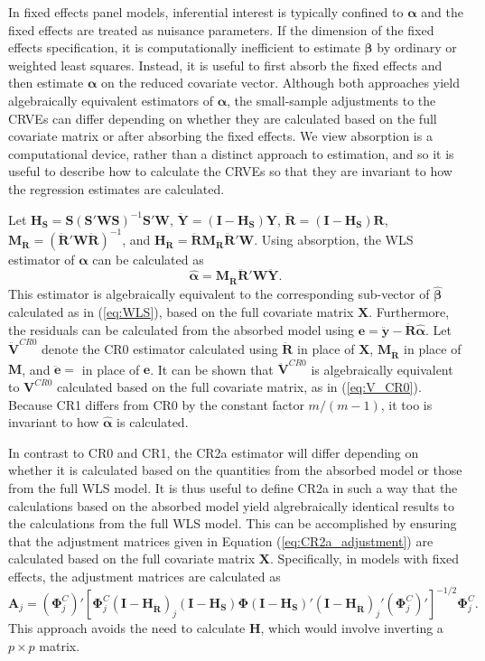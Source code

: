 \documentclass[12pt]{article}\usepackage[]{graphicx}\usepackage[]{color}
\newcommand{\bm}{\mathbf}
\newcommand{\bs}{\boldsymbol}
\begin{document}
In fixed effects panel models, inferential interest is typically confined to $\bs\alpha$ and the fixed effects are treated as nuisance parameters. 
If the dimension of the fixed effects specification, it is computationally inefficient to estimate $\bs\beta$ by ordinary or weighted least squares. 
Instead, it is useful to first absorb the fixed effects and then estimate $\bs\alpha$ on the reduced covariate vector.
Although both approaches yield algebraically equivalent estimators of $\bs\alpha$, the small-sample adjustments to the CRVEs can differ depending on whether they are calculated based on the full covariate matrix or after absorbing the fixed effects. 
We view absorption is a computational device, rather than a distinct approach to estimation, and so it is useful to describe how to calculate the CRVEs so that they are invariant to how the regression estimates are calculated.

Let $\bm{H_S} = \bm{S}\left(\bm{S}'\bm{W}\bm{S}\right)^{-1} \bm{S}'\bm{W}$, $\bm{\ddot{Y}} = \left(\bm{I} - \bm{H_S}\right)\bm{Y}$, $\bm{\ddot{R}} = \left(\bm{I} - \bm{H_S}\right)\bm{R}$, $\bm{M_{\ddot{R}}} = \left(\bm{\ddot{R}}' \bm{W} \bm{\ddot{R}}\right)^{-1}$, and $\bm{H_{\ddot{R}}} = \bm{\ddot{R}}\bm{M_{\ddot{R}}} \bm{\ddot{R}}' \bm{W}$. 
Using absorption, the WLS estimator of $\bs\alpha$ can be calculated as \[
\bs{\hat\alpha} = \bm{M_{\ddot{R}}} \bm{\ddot{R}}' \bm{W} \bm{\ddot{Y}}. \]
This estimator is algebraically equivalent to the corresponding sub-vector of $\bs{\hat\beta}$  calculated as in (\ref{eq:WLS}), based on the full covariate matrix $\bm{X}$. 
Furthermore, the residuals can be calculated from the absorbed model using $\bm{e} = \bm{\ddot{y}} - \bm{\ddot{R}} \bs{\hat\alpha}$.
Let $\bm{\ddot{V}}^{CR0}$ denote the CR0 estimator calculated using $\bm{\ddot{R}}$ in place of $\bm{X}$, $\bm{M_{\ddot{R}}}$ in place of $\bm{M}$, and $\bm{\ddot{e}} = $ in place of $\bm{e}$. It can be shown that $\bm{\ddot{V}}^{CR0}$ is algebraically equivalent to $\bm{V}^{CR0}$ calculated based on the full covariate matrix, as in (\ref{eq:V_CR0}). 
Because CR1 differs from CR0 by the constant factor $m / (m - 1)$, it too is invariant to how $\bs{\hat\alpha}$ is calculated. 

In contrast to CR0 and CR1, the CR2a estimator will differ depending on whether it is calculated based on the quantities from the absorbed model or those from the full WLS model. 
It is thus useful to define CR2a in such a way that the calculations based on the absorbed model yield algrebraically identical results to the calculations from the full WLS model. 
This can be accomplished by ensuring that the adjustment matrices given in Equation (\ref{eq:CR2a_adjustment}) are calculated based on the full covariate matrix $\bm{X}$. Specifically, in models with fixed effects, the adjustment matrices are calculated as \[
\bm{A}_j = \left(\bs\Phi_j^C\right)' \left[\bs\Phi_j^C\left(\bm{I} - \bm{H_{\ddot{R}}}\right)_j \left(\bm{I} - \bm{H_S}\right) \bs\Phi \left(\bm{I} - \bm{H_S}\right)' \left(\bm{I} - \bm{H_{\ddot{R}}}\right)_j' \left(\bs\Phi_j^C\right)' \right]^{-1/2}\bs\Phi_j^C.
\]
This approach avoids the need to calculate $\bm{H}$, which would involve inverting a $p \times p$ matrix.
\end{document}
